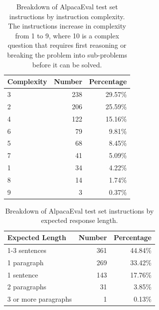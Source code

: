 \documentclass{article}
\begin{document}
\begin{table}[t]
\centering
   \caption{
   \label{tab:instruction_complexity_breakdown} Breakdown of AlpacaEval test set instructions by instruction complexity. The instructions increase in complexity from 1 to 9, where 10 is a complex question that requires first reasoning or breaking the problem into sub-problems before it can be solved.
   }
\begin{tabular}{lrr}
\toprule
\textbf{Complexity}     & \textbf{Number} & \textbf{Percentage}  \\
\midrule
3 &  238 & 29.57\% \\
2 & 206 & 25.59\% \\
4 & 122 & 15.16\% \\
6 & 79 & 9.81\% \\
5 & 68 & 8.45\% \\
7 & 41 & 5.09\% \\
1 & 34 & 4.22\% \\
8 & 14 & 1.74\% \\
9 & 3 & 0.37\% \\
\bottomrule
\end{tabular}
\end{table}


\begin{table}[t]
\centering
   \caption{
\label{tab:instruction_expected_response_length_breakdown} Breakdown of AlpacaEval test set instructions by expected response length.
   }
\begin{tabular}{lrr}
\toprule
\textbf{Expected Length}     & \textbf{Number} & \textbf{Percentage}  \\
\midrule
1-3 sentences & 361 & 44.84\% \\
1 paragraph & 269 & 33.42\% \\
1 sentence & 143 & 17.76\% \\
2 paragraphs & 31 & 3.85\% \\
3 or more paragraphs & 1 & 0.13\% \\
\bottomrule
\end{tabular}
\end{table}
\end{document}
